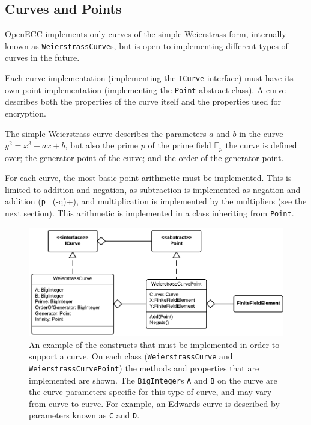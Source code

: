 \subsection{Curves and Points}
\label{sec:implementation_curves}

OpenECC implements only curves of the simple Weierstrass form, internally known as \verb+WeierstrassCurve+s,
but is open to implementing different types of curves in the future.

Each curve implementation (implementing the \verb+ICurve+ interface) must have its own point implementation
(implementing the \verb+Point+ abstract class). A curve describes both the properties of the curve itself and
the properties used for encryption.

The simple Weierstrass curve describes the parameters \(a\) and \(b\) in the curve \(y^2 = x^3 + ax + b\), but
also the prime \(p\) of the prime field \(\mathbb{F}_p\) the curve is defined over; the generator point of the
curve; and the order of the generator point.

For each curve, the most basic point arithmetic must be implemented. This is limited to addition and negation, as
subtraction is implemented as negation and addition (\verb+p + (-q)+), and multiplication is implemented by the
multipliers (see the next section). This arithmetic is implemented in a class inheriting from \verb+Point+.

\begin{figure}[htb]
	\centering
	\includegraphics[width=1\textwidth]{implementation/curves}
	\caption{An example of the constructs that must be implemented in order to support a curve. On each class
		(\texttt{WeierstrassCurve} and \texttt{WeierstrassCurvePoint}) the methods and properties
		that are implemented are shown. The \texttt{BigInteger}s \texttt{A} and \texttt{B} on the curve are
		the curve parameters specific for this type of curve, and may vary from curve to curve. For example,
		an Edwards curve is described by parameters known as \texttt{C} and \texttt{D}.}
\end{figure}

